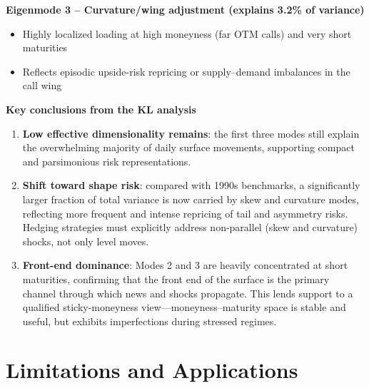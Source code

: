 \documentclass[a4paper,12pt]{report}
\begin{document}
\textbf{Eigenmode 3 – Curvature/wing adjustment (explains 3.2\% of variance)}  
\begin{itemize}
    \item Highly localized loading at high moneyness (far OTM calls) and very short maturities
    \item Reflects episodic upside-risk repricing or supply--demand imbalances in the call wing
\end{itemize}

\textbf{Key conclusions from the KL analysis}
\begin{enumerate}
    \item \textbf{Low effective dimensionality remains}: the first three modes still explain the overwhelming majority of daily surface movements, supporting compact and parsimonious risk representations.
    
    \item \textbf{Shift toward shape risk}: compared with 1990s benchmarks, a significantly larger fraction of total variance is now carried by skew and curvature modes, reflecting more frequent and intense repricing of tail and asymmetry risks. Hedging strategies must explicitly address non-parallel (skew and curvature) shocks, not only level moves.
    
    \item \textbf{Front-end dominance}: Modes 2 and 3 are heavily concentrated at short maturities, confirming that the front end of the surface is the primary channel through which news and shocks propagate. This lends support to a qualified sticky-moneyness view—moneyness--maturity space is stable and useful, but exhibits imperfections during stressed regimes.
\end{enumerate}


\chapter{Limitations and Applications}
\end{document}
